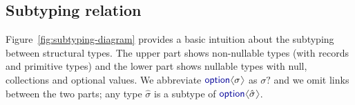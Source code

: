 \documentclass[10pt,preprint,blind,clearpagebib]{sigplanconf}
\newcommand{\langl}{\begin{picture}(4.5,7)
\put(1.1,2.5){\rotatebox{60}{\line(1,0){5.5}}}
\put(1.1,2.5){\rotatebox{300}{\line(1,0){5.5}}}
\end{picture}}
\newcommand{\rangl}{\begin{picture}(4.5,7)
\put(.9,2.5){\rotatebox{120}{\line(1,0){5.5}}}
\put(.9,2.5){\rotatebox{240}{\line(1,0){5.5}}}
\end{picture}}
\newcommand{\kvd}[1]{\textnormal{\textcolor{kvdclr}{\sffamily #1}}}
\begin{document}

\subsection{Subtyping relation}
\label{sec:inference-subtyping}

Figure~\ref{fig:subtyping-diagram} provides a basic intuition about the subtyping between
structural types. The upper part shows non-nullable types (with records and primitive types) and 
the lower part shows nullable types with \kvd{null}, collections and optional values. We 
abbreviate $\kvd{option}\langl\sigma\rangl$ as $\sigma?$ and we omit links between the two parts;
any type $\hat{\sigma}$ is a subtype of $\kvd{option}\langl\hat{\sigma}\rangl$.
\end{document}
